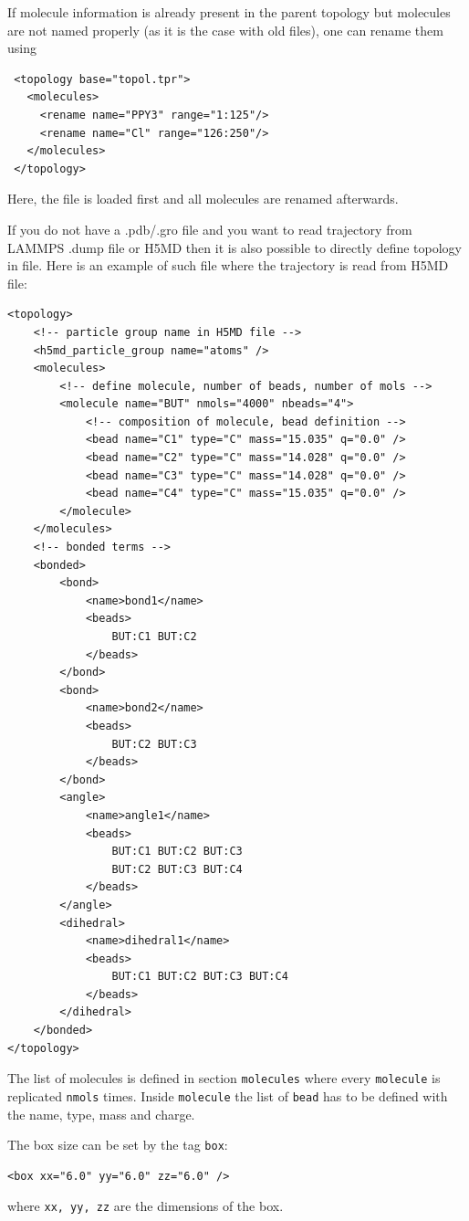 If molecule information is already present in the parent topology but molecules are not named properly (as it is the case with old \gromacs {} files), one can rename them using
\begin{lstlisting}
 <topology base="topol.tpr">
   <molecules>
     <rename name="PPY3" range="1:125"/>
     <rename name="Cl" range="126:250"/>
   </molecules>
 </topology>
\end{lstlisting}
Here, the file  is loaded first and all molecules are renamed afterwards.

If you do not have a .pdb/.gro file and you want to read trajectory from LAMMPS .dump file or H5MD then it is also possible to directly define topology in \xml file.
Here is an example of such file where the trajectory is read from H5MD file:
\begin{lstlisting}
<topology>
    <!-- particle group name in H5MD file -->
    <h5md_particle_group name="atoms" />
    <molecules>
        <!-- define molecule, number of beads, number of mols -->
        <molecule name="BUT" nmols="4000" nbeads="4">
            <!-- composition of molecule, bead definition -->
            <bead name="C1" type="C" mass="15.035" q="0.0" />
            <bead name="C2" type="C" mass="14.028" q="0.0" />
            <bead name="C3" type="C" mass="14.028" q="0.0" />
            <bead name="C4" type="C" mass="15.035" q="0.0" />
        </molecule>
    </molecules>
    <!-- bonded terms -->
    <bonded>
        <bond>
            <name>bond1</name>
            <beads>
                BUT:C1 BUT:C2
            </beads>
        </bond>
        <bond>
            <name>bond2</name>
            <beads>
                BUT:C2 BUT:C3
            </beads>
        </bond>
        <angle>
            <name>angle1</name>
            <beads>
                BUT:C1 BUT:C2 BUT:C3
                BUT:C2 BUT:C3 BUT:C4
            </beads>
        </angle>
        <dihedral>
            <name>dihedral1</name>
            <beads>
                BUT:C1 BUT:C2 BUT:C3 BUT:C4
            </beads>
        </dihedral>
    </bonded>
</topology>
\end{lstlisting}

The list of molecules is defined in section \texttt{molecules} where every \texttt{molecule} is replicated \texttt{nmols} times.
Inside \texttt{molecule} the list of \texttt{bead} has to be defined with the name, type, mass and charge.

The box size can be set by the tag \texttt{box}:
\begin{lstlisting}
<box xx="6.0" yy="6.0" zz="6.0" />
\end{lstlisting}
where \texttt{xx, yy, zz} are the dimensions of the box.


